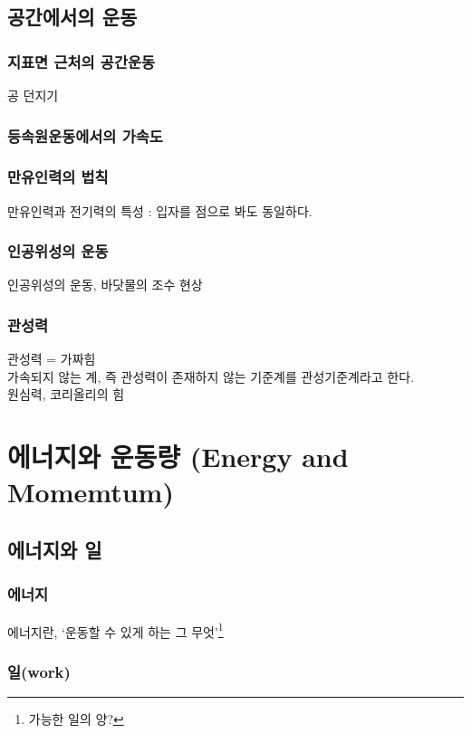 \documentclass[10pt,a4paper]{report}
\begin{document}
	\chapter{공간에서의 운동}
	
	\section{지표면 근처의 공간운동}
	
	공 던지기
	
	\section{등속원운동에서의 가속도}
	
	\section{만유인력의 법칙}
	
	만유인력과 전기력의 특성 : 입자를 점으로 봐도 동일하다.
	
	\section{인공위성의 운동}
	
	인공위성의 운동, 바닷물의 조수 현상
	
	\section{관성력}
	
	관성력 = 가짜힘\\
	가속되지 않는 계, 즉 관성력이 존재하지 않는 기준계를 관성기준계라고 한다.\\
	원심력, 코리올리의 힘
	
	\part{에너지와 운동량 (Energy and Momemtum)}
	
	\chapter{에너지와 일}
	
	\section{에너지}
	
	에너지란, `운동할 수 있게 하는 그 무엇'\footnote{가능한 일의 양?}
	
	\section{일(work)}
	
	
\end{document}

